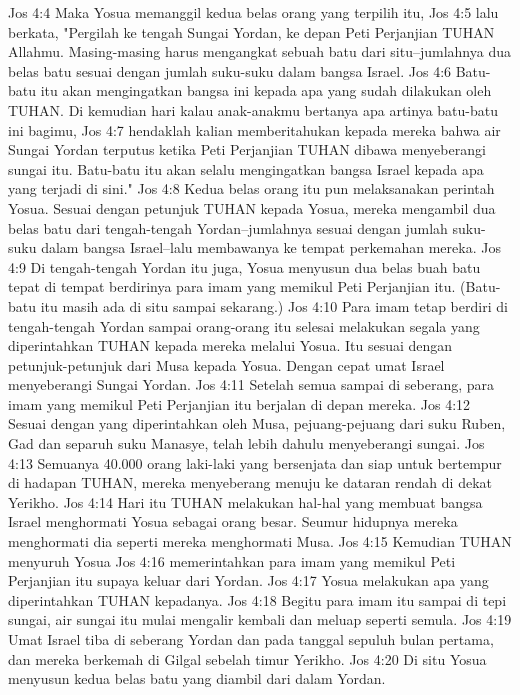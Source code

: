 Jos 4:4  Maka Yosua memanggil kedua belas orang yang terpilih itu,
Jos 4:5  lalu berkata, "Pergilah ke tengah Sungai Yordan, ke depan Peti Perjanjian TUHAN Allahmu. Masing-masing harus mengangkat sebuah batu dari situ--jumlahnya dua belas batu sesuai dengan jumlah suku-suku dalam bangsa Israel.
Jos 4:6  Batu-batu itu akan mengingatkan bangsa ini kepada apa yang sudah dilakukan oleh TUHAN. Di kemudian hari kalau anak-anakmu bertanya apa artinya batu-batu ini bagimu,
Jos 4:7  hendaklah kalian memberitahukan kepada mereka bahwa air Sungai Yordan terputus ketika Peti Perjanjian TUHAN dibawa menyeberangi sungai itu. Batu-batu itu akan selalu mengingatkan bangsa Israel kepada apa yang terjadi di sini."
Jos 4:8  Kedua belas orang itu pun melaksanakan perintah Yosua. Sesuai dengan petunjuk TUHAN kepada Yosua, mereka mengambil dua belas batu dari tengah-tengah Yordan--jumlahnya sesuai dengan jumlah suku-suku dalam bangsa Israel--lalu membawanya ke tempat perkemahan mereka.
Jos 4:9  Di tengah-tengah Yordan itu juga, Yosua menyusun dua belas buah batu tepat di tempat berdirinya para imam yang memikul Peti Perjanjian itu. (Batu-batu itu masih ada di situ sampai sekarang.)
Jos 4:10  Para imam tetap berdiri di tengah-tengah Yordan sampai orang-orang itu selesai melakukan segala yang diperintahkan TUHAN kepada mereka melalui Yosua. Itu sesuai dengan petunjuk-petunjuk dari Musa kepada Yosua. Dengan cepat umat Israel menyeberangi Sungai Yordan.
Jos 4:11  Setelah semua sampai di seberang, para imam yang memikul Peti Perjanjian itu berjalan di depan mereka.
Jos 4:12  Sesuai dengan yang diperintahkan oleh Musa, pejuang-pejuang dari suku Ruben, Gad dan separuh suku Manasye, telah lebih dahulu menyeberangi sungai.
Jos 4:13  Semuanya 40.000 orang laki-laki yang bersenjata dan siap untuk bertempur di hadapan TUHAN, mereka menyeberang menuju ke dataran rendah di dekat Yerikho.
Jos 4:14  Hari itu TUHAN melakukan hal-hal yang membuat bangsa Israel menghormati Yosua sebagai orang besar. Seumur hidupnya mereka menghormati dia seperti mereka menghormati Musa.
Jos 4:15  Kemudian TUHAN menyuruh Yosua
Jos 4:16  memerintahkan para imam yang memikul Peti Perjanjian itu supaya keluar dari Yordan.
Jos 4:17  Yosua melakukan apa yang diperintahkan TUHAN kepadanya.
Jos 4:18  Begitu para imam itu sampai di tepi sungai, air sungai itu mulai mengalir kembali dan meluap seperti semula.
Jos 4:19  Umat Israel tiba di seberang Yordan dan pada tanggal sepuluh bulan pertama, dan mereka berkemah di Gilgal sebelah timur Yerikho.
Jos 4:20  Di situ Yosua menyusun kedua belas batu yang diambil dari dalam Yordan.

